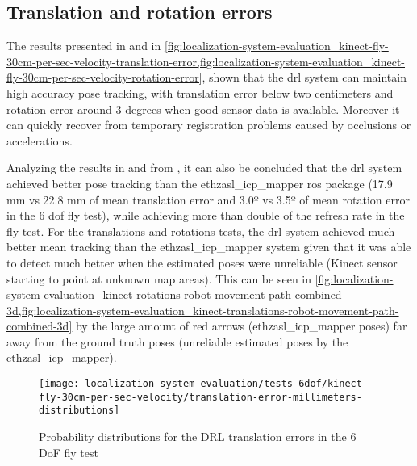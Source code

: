 \subsection{Translation and rotation errors}

The results presented in  and in \cref{fig:localization-system-evaluation_kinect-fly-30cm-per-sec-velocity-translation-error,fig:localization-system-evaluation_kinect-fly-30cm-per-sec-velocity-rotation-error}, shown that the \gls{drl} system can maintain high accuracy pose tracking, with translation error below two centimeters and rotation error around 3 degrees when good sensor data is available. Moreover it can quickly recover from temporary registration problems caused by occlusions or accelerations.

Analyzing the results in  and from , it can also be concluded that the \gls{drl} system achieved better pose tracking than the ethzasl\_icp\_mapper \gls{ros} package (17.9 mm vs 22.8 mm of mean translation error and 3.0º vs 3.5º of mean rotation error in the 6 \gls{dof} fly test), while achieving more than double of the refresh rate in the fly test. For the translations and rotations tests, the \gls{drl} system achieved much better mean tracking than the ethzasl\_icp\_mapper system given that it was able to detect much better when the estimated poses were unreliable (Kinect sensor starting to point at unknown map areas). This can be seen in \cref{fig:localization-system-evaluation_kinect-rotations-robot-movement-path-combined-3d,fig:localization-system-evaluation_kinect-translations-robot-movement-path-combined-3d} by the large amount of red arrows (ethzasl\_icp\_mapper poses) far away from the ground truth poses (unreliable estimated poses by the ethzasl\_icp\_mapper).




\begin{figure}[H]
	\centering
	\texttt{[image: localization-system-evaluation/tests-6dof/kinect-fly-30cm-per-sec-velocity/translation-error-millimeters-distributions]}
	\caption{Probability distributions for the DRL translation errors in the 6 DoF fly test}
	\label{fig:localization-system-evaluation_kinect-fly-30cm-per-sec-velocity-translation-error}
\end{figure}

